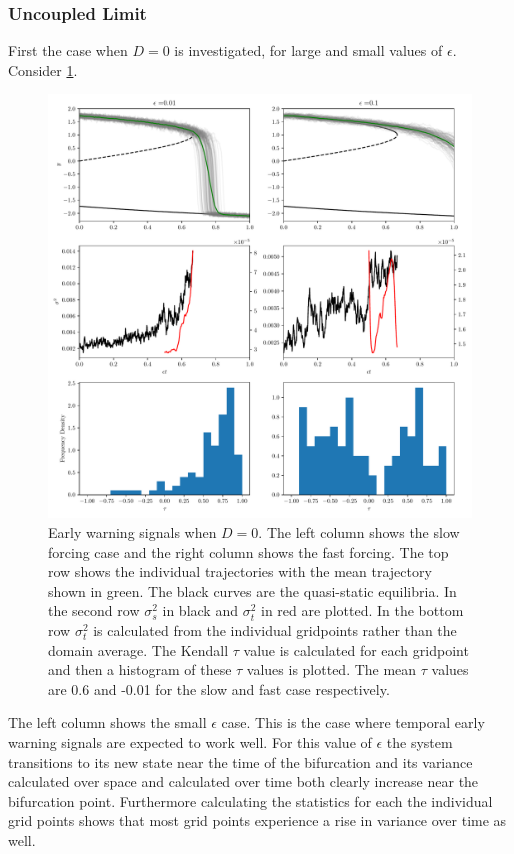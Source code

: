 \subsubsection{Uncoupled Limit}
First the case  when $D = 0$ is investigated, for large and small values of $\epsilon$. Consider \cref{fig:uncoupled_timeseries}.
\begin{figure}
  \centering
  \includegraphics[width=\textwidth,keepaspectratio]{uncoupled_variance}
  \caption[Early warning signals in the uncoupled limit]{Early warning signals when $D = 0$. The left column shows the slow forcing case and the right column shows the fast forcing.
    The top row shows the individual trajectories with the mean trajectory shown in green. The black curves are the quasi-static equilibria.
    In the second row  $\sigma_s^2$ in black and $\sigma_t^2$ in red are plotted. In the bottom row $\sigma_t^2$ is calculated from the individual gridpoints
    rather than the domain average.  The Kendall $\tau$ value is calculated for each gridpoint and then a histogram of these $\tau$ values is plotted. The mean $\tau$ values
    are 0.6 and -0.01 for the slow and fast case respectively.}
  \label{fig:uncoupled_timeseries}
\end{figure}
The left column shows the small $\epsilon$ case. This is the case
where temporal early warning signals are expected to work well. For this value of $\epsilon$ the system
transitions to its new state near the time of the bifurcation and its variance calculated over
space and calculated over time both clearly increase near the bifurcation point. Furthermore
calculating the statistics for each the individual grid points shows that most grid points 
experience a rise in variance over time as well.

